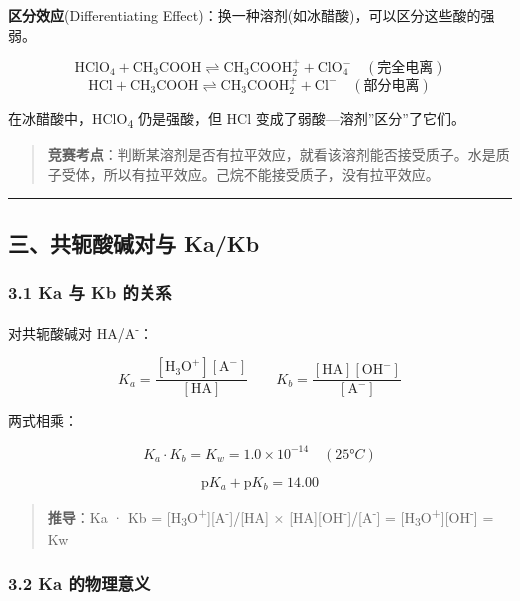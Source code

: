 \textbf{区分效应}(Differentiating Effect)：换一种溶剂(如冰醋酸)，可以区分这些酸的强弱。

\[
\mathrm{HClO_4 + CH_3COOH \rightleftharpoons CH_3COOH_2^+ + ClO_4^-} \quad (\text{完全电离})
\]
\[
\mathrm{HCl + CH_3COOH \rightleftharpoons CH_3COOH_2^+ + Cl^-} \quad (\text{部分电离})
\]

在冰醋酸中，HClO\textsubscript{4} 仍是强酸，但 HCl 变成了弱酸---溶剂''区分''了它们。

\begin{quote}
\textbf{竞赛考点}：判断某溶剂是否有拉平效应，就看该溶剂能否接受质子。水是质子受体，所以有拉平效应。己烷不能接受质子，没有拉平效应。
\end{quote}

\begin{center}\rule{0.5\linewidth}{0.5pt}\end{center}

\subsection{三、共轭酸碱对与 Ka/Kb}\label{ux4e09ux5171ux8f6dux9178ux78b1ux5bf9ux4e0e-kakb}

\subsubsection{3.1 Ka 与 Kb 的关系}\label{ka-ux4e0e-kb-ux7684ux5173ux7cfb}

对共轭酸碱对 HA/A\textsuperscript{-}：

\[
K_a = \frac{[\mathrm{H_3O^+}][\mathrm{A^-}]}{[\mathrm{HA}]} \qquad K_b = \frac{[\mathrm{HA}][\mathrm{OH^-}]}{[\mathrm{A^-}]}
\]

两式相乘：

\[
\boxed{K_a \cdot K_b = K_w = 1.0 \times 10^{-14} \quad (25°C)}
\]

\[
\boxed{\mathrm{p}K_a + \mathrm{p}K_b = 14.00}
\]

\begin{quote}
\textbf{推导}：Ka · Kb = {[}H\textsubscript{3}O\textsuperscript{+}{]}{[}A\textsuperscript{-}{]}/{[}HA{]} × {[}HA{]}{[}OH\textsuperscript{-}{]}/{[}A\textsuperscript{-}{]} = {[}H\textsubscript{3}O\textsuperscript{+}{]}{[}OH\textsuperscript{-}{]} = Kw
\end{quote}

\subsubsection{3.2 Ka 的物理意义}\label{ka-ux7684ux7269ux7406ux610fux4e49}

